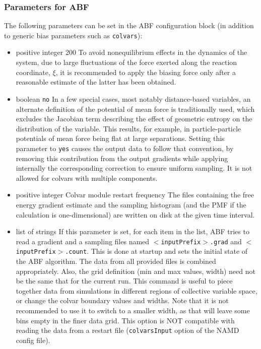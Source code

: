 \subsubsection{Parameters for ABF}

The following parameters can be set in the ABF configuration block
(in addition to generic bias parameters such as \texttt{colvars}):

\begin{itemize}
\item {}
  {positive integer}
  {200}
  {To avoid nonequilibrium effects in the dynamics of the system, due to large
    fluctuations of the force exerted along the reaction coordinate, $\xi$, it
    is recommended to apply the biasing force only after a reasonable estimate
    of the latter has been obtained.}

\item {}
  {boolean}
  {\texttt{no}}
  {In a few special cases, most notably distance-based variables, an alternate definition of
    the potential of mean force is traditionally used, which excludes the Jacobian
    term describing the effect of geometric entropy on the distribution of the variable.
    This results, for example, in particle-particle potentials of mean force being flat
    at large separations.
    Setting this parameter to \texttt{yes} causes the output data to follow that convention,
    by removing this contribution from the output gradients while
    applying internally the corresponding correction to ensure uniform sampling.
    It is not allowed for colvars with multiple components.}

\item {}
  {positive integer}
  {Colvar module restart frequency}
  {The files containing the free energy gradient estimate and the sampling histogram
    (and the PMF if the calculation is one-dimensional) are written on disk at the given
    time interval.}

\item {}
  {list of strings}
  {If this parameter is set, for each item in the list, ABF tries to read
    a gradient and a sampling files named \texttt{$<$inputPrefix$>$.grad}
    and \texttt{$<$inputPrefix$>$.count}. This is done at
    startup and sets the initial state of the ABF algorithm.
    The data from all provided files is combined appropriately.
    Also, the grid definition (min and max values, width) need not be the same
    that for the current run. This command is useful to piece together
    data from simulations in different regions of collective variable space,
    or change the colvar boundary values and widths. Note that it is not
    recommended to use it to switch to a smaller width, as that will leave
    some bins empty in the finer data grid.
    This option is NOT compatible with reading the data from a restart file
    (\texttt{colvarsInput} option of the NAMD config file).}


\end{itemize}

